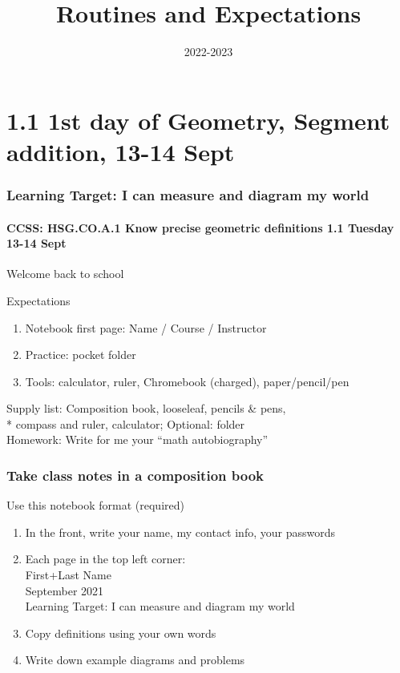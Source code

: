 

\title{Routines and Expectations}
\date{2022-2023}


\frame{\titlepage}

\section[Outline]{}
\frame{\tableofcontents}

\section{1.1 1st day of Geometry, Segment addition, 13-14 Sept}
\frame
{
  \frametitle{Learning Target: I can measure and diagram my world}
  \framesubtitle{CCSS: HSG.CO.A.1 Know precise geometric definitions \hfill \alert{1.1 Tuesday 13-14 Sept}}

  Welcome back to school
  \begin{block}{Expectations}
  \begin{enumerate}
      \item Notebook first page: Name / Course / Instructor
      \item Practice: pocket folder
      \item Tools: calculator, ruler, Chromebook (charged), paper/pencil/pen
  \end{enumerate}
  \end{block}
  Supply list: Composition book, looseleaf, pencils \& pens, \\*
  compass and ruler, calculator; Optional: folder \\[0.25cm]
  Homework: Write for me your ``math autobiography''
}

\frame
{
  \frametitle{Take class notes in a composition book}
  \begin{block}{Use this notebook format (required)}
    \begin{enumerate}
      \item In the front, write your name, my contact info, your passwords
      \item Each page in the top left corner: \\ \qquad First+Last Name \\
       September 2021 \\ \qquad Learning Target: I can measure and diagram my world \vspace{0.25cm}
      \item Copy definitions using your own words
      \item Write down example diagrams and problems
    \end{enumerate}
    \end{block}
}

